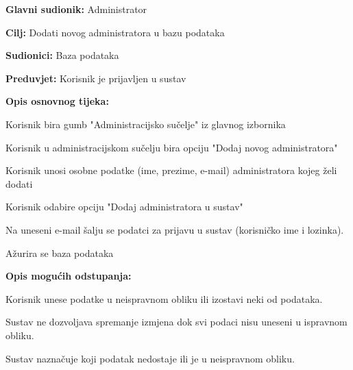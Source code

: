 					\noindent {}
					\begin{packed_item}
	
						\item \textbf{Glavni sudionik: } Administrator
						\item  \textbf{Cilj:} Dodati novog administratora u bazu podataka
						\item  \textbf{Sudionici:} Baza podataka
						\item  \textbf{Preduvjet:} Korisnik je prijavljen u sustav
						\item  \textbf{Opis osnovnog tijeka:}
						
						\item[] \begin{packed_enum}
	
							\item Korisnik bira gumb "Administracijsko sučelje" iz glavnog izbornika
							\item Korisnik u administracijskom sučelju bira opciju "Dodaj novog administratora"
							\item Korisnik unosi osobne podatke (ime, prezime, e-mail) administratora kojeg želi dodati
							\item Korisnik odabire opciju "Dodaj administratora u sustav"
							\item Na uneseni e-mail šalju se podatci za prijavu u sustav (korisničko ime i lozinka).
							\item Ažurira se baza podataka
							

					
						\end{packed_enum}

						\item  \textbf{Opis mogućih odstupanja:}
						
						\item[] \begin{packed_item}
							
							\item[3.a]  Korisnik unese podatke u neispravnom obliku ili izostavi neki od podataka.
							\item[] \begin{packed_enum}
								
								\item Sustav ne dozvoljava spremanje izmjena dok svi podaci nisu uneseni u ispravnom obliku.
								\item Sustav naznačuje koji podatak nedostaje ili je u neispravnom obliku.
								

\end{packed_enum}
\end{packed_item}
\end{packed_item}
